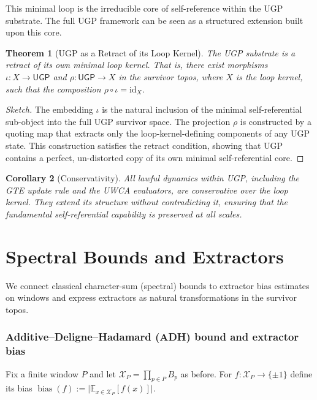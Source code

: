 \documentclass[12pt]{article}
\newtheorem{theorem}{Theorem}[section]
\newtheorem{corollary}[theorem]{Corollary}
\numberwithin{equation}{section}
\begin{document}
This minimal loop is the irreducible core of self-reference within the UGP substrate. The full UGP framework can be seen as a structured extension built upon this core.

\begin{theorem}[UGP as a Retract of its Loop Kernel]
\label{thm:ugp-retract-formal}
The UGP substrate is a \emph{retract} of its own minimal loop kernel. That is, there exist morphisms $\iota:X\to\mathsf{UGP}$ and $\rho:\mathsf{UGP}\to X$ in the survivor topos, where $X$ is the loop kernel, such that the composition $\rho\circ\iota=\mathrm{id}_X$.
\end{theorem}
\begin{proof}[Sketch]
The embedding $\iota$ is the natural inclusion of the minimal self-referential sub-object into the full UGP survivor space. The projection $\rho$ is constructed by a quoting map that extracts only the loop-kernel-defining components of any UGP state. This construction satisfies the retract condition, showing that UGP contains a perfect, un-distorted copy of its own minimal self-referential core.
\end{proof}

\begin{corollary}[Conservativity]
All lawful dynamics within UGP, including the GTE update rule and the UWCA evaluators, are conservative over the loop kernel. They extend its structure without contradicting it, ensuring that the fundamental self-referential capability is preserved at all scales.
\end{corollary}

\section{Spectral Bounds and Extractors}\label{sec:spectral-internal}
We connect classical character-sum (spectral) bounds to extractor bias estimates on windows and express extractors as natural transformations in the survivor topos.

\subsubsection{Additive–Deligne–Hadamard (ADH) bound and extractor bias}\label{subsec:C3-ADH}
Fix a finite window $P$ and let $\mathscr{X}_P=\prod_{p\in P} B_p$ as before. For $f: \mathscr{X}_P\to\{\pm1\}$ define its bias $\operatorname{bias}(f):=\big| \mathbb{E}_{x\in\mathscr{X}_P}[f(x)]\big|$.
\end{document}
